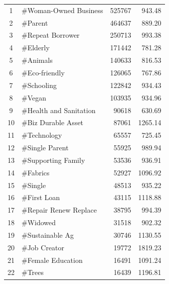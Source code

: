 \begin{longtable}{|c|l|r|r|}
	1 &           \#Woman-Owned Business &         525767 &               943.48 \\
	2 &                         \#Parent &         464637 &               889.20 \\
	3 &                \#Repeat Borrower &         250713 &               993.38 \\
	4 &                        \#Elderly &         171442 &               781.28 \\
	5 &                        \#Animals &         140633 &               816.53 \\
	6 &                   \#Eco-friendly &         126065 &               767.86 \\
	7 &                      \#Schooling &         122842 &               934.43 \\
	8 &                          \#Vegan &         103935 &               934.96 \\
	9 &          \#Health and Sanitation &          90618 &               630.69 \\
   10 &              \#Biz Durable Asset &          87061 &              1265.14 \\
   11 &                     \#Technology &          65557 &               725.45 \\
   12 &                  \#Single Parent &          55925 &               989.94 \\
   13 &              \#Supporting Family &          53536 &               936.91 \\
   14 &                        \#Fabrics &          52927 &              1096.92 \\
   15 &                         \#Single &          48513 &               935.22 \\
   16 &                     \#First Loan &          43115 &              1118.88 \\
   17 &           \#Repair Renew Replace &          38795 &               994.39 \\
   18 &                        \#Widowed &          31518 &               902.32 \\
   19 &                 \#Sustainable Ag &          30746 &              1130.55 \\
   20 &                    \#Job Creator &          19772 &              1819.23 \\
   21 &               \#Female Education &          16491 &              1091.24 \\
   22 &                          \#Trees &          16439 &              1196.81 \\

\end{longtable}
